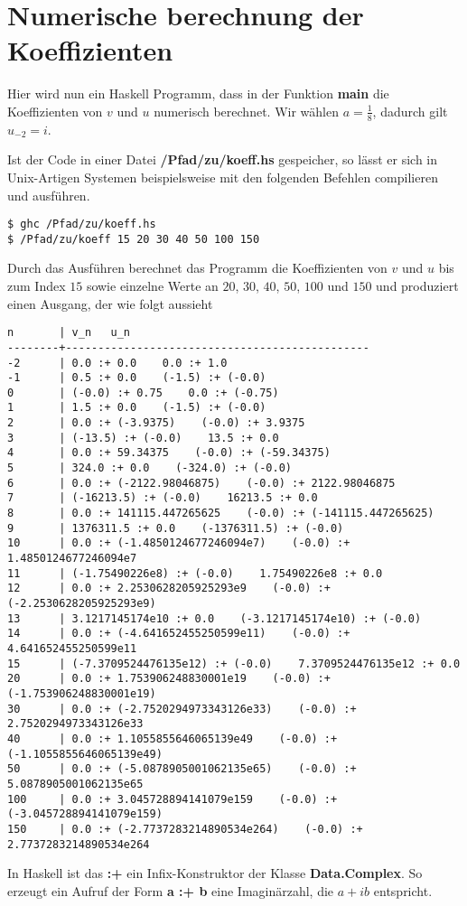 \chapter{Numerische berechnung der Koeffizienten} \label{anh:Programm}
Hier wird nun ein Haskell Programm, dass in der Funktion \textbf{main} die
Koeffizienten von $v$ und $u$ numerisch berechnet. Wir wählen $a=\frac{1}{8}$,
dadurch gilt $u_{-2}=i$.


Ist der Code in einer Datei \textbf{/Pfad/zu/koeff.hs} gespeicher, so lässt er
sich in Unix-Artigen Systemen beispielsweise mit den folgenden Befehlen
compilieren und ausführen.
\begin{lstlisting}[style=Bash]
$ ghc /Pfad/zu/koeff.hs
$ /Pfad/zu/koeff 15 20 30 40 50 100 150
\end{lstlisting}
Durch das Ausführen berechnet das Programm die Koeffizienten von $v$ und $u$
bis zum Index $15$ sowie einzelne Werte an $20$, $30$, $40$, $50$, $100$ und
$150$ und produziert einen Ausgang, der wie folgt aussieht
\begin{lstlisting}[style=Bash]
n       | v_n   u_n
--------+-----------------------------------------------
-2      | 0.0 :+ 0.0    0.0 :+ 1.0
-1      | 0.5 :+ 0.0    (-1.5) :+ (-0.0)
0       | (-0.0) :+ 0.75    0.0 :+ (-0.75)
1       | 1.5 :+ 0.0    (-1.5) :+ (-0.0)
2       | 0.0 :+ (-3.9375)    (-0.0) :+ 3.9375
3       | (-13.5) :+ (-0.0)    13.5 :+ 0.0
4       | 0.0 :+ 59.34375    (-0.0) :+ (-59.34375)
5       | 324.0 :+ 0.0    (-324.0) :+ (-0.0)
6       | 0.0 :+ (-2122.98046875)    (-0.0) :+ 2122.98046875
7       | (-16213.5) :+ (-0.0)    16213.5 :+ 0.0
8       | 0.0 :+ 141115.447265625    (-0.0) :+ (-141115.447265625)
9       | 1376311.5 :+ 0.0    (-1376311.5) :+ (-0.0)
10      | 0.0 :+ (-1.4850124677246094e7)    (-0.0) :+ 1.4850124677246094e7
11      | (-1.75490226e8) :+ (-0.0)    1.75490226e8 :+ 0.0
12      | 0.0 :+ 2.2530628205925293e9    (-0.0) :+ (-2.2530628205925293e9)
13      | 3.1217145174e10 :+ 0.0    (-3.1217145174e10) :+ (-0.0)
14      | 0.0 :+ (-4.641652455250599e11)    (-0.0) :+ 4.641652455250599e11
15      | (-7.3709524476135e12) :+ (-0.0)    7.3709524476135e12 :+ 0.0
20      | 0.0 :+ 1.753906248830001e19    (-0.0) :+ (-1.753906248830001e19)
30      | 0.0 :+ (-2.7520294973343126e33)    (-0.0) :+ 2.7520294973343126e33
40      | 0.0 :+ 1.1055855646065139e49    (-0.0) :+ (-1.1055855646065139e49)
50      | 0.0 :+ (-5.0878905001062135e65)    (-0.0) :+ 5.0878905001062135e65
100     | 0.0 :+ 3.045728894141079e159    (-0.0) :+ (-3.045728894141079e159)
150     | 0.0 :+ (-2.7737283214890534e264)    (-0.0) :+ 2.7737283214890534e264

\end{lstlisting}
In Haskell ist das \textbf{:+} ein Infix-Konstruktor der Klasse
\textbf{Data.Complex}. So erzeugt ein Aufruf der Form \textbf{a :+ b} eine
Imaginärzahl, die $a+ib$ entspricht.

